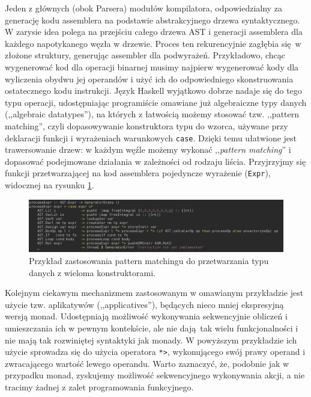 Jeden z głównych (obok Parsera) modułów kompilatora, odpowiedzialny za generację kodu assemblera na podstawie abstrakcyjnego drzewa syntaktycznego. W zarysie idea polega na przejściu całego drzewa AST i generacji assemblera dla każdego napotykanego węzła w drzewie. Proces ten rekurencyjnie zagłębia się w złożone struktury, generując assembler dla podwyrażeń. Przykładowo, chcąc wygenerować kod dla operacji binarnej musimy najpierw wygenerować kody dla wyliczenia obydwu jej operandów i użyć ich do odpowiedniego skonstruowania ostatecznego kodu instrukcji. Język Haskell wyjątkowo dobrze nadaje się do tego typu operacji, udostępniając programiście omawiane już algebraiczne typy danych (,,algebraic datatypes''), na których z łatwością możemy stosować tzw. ,,pattern matching'', czyli dopasowywanie konstruktora typu do wzorca, używane przy deklaracji funkcji i wyrażeniach warunkowych \texttt{case}. Dzięki temu ułatwione jest trawersowanie drzew: w każdym węźle możemy wykonać ,,\textit{pattern matching}'' i dopasować podejmowane działania w zależności od rodzaju liścia. Przyjrzyjmy się funkcji przetwarzającej na kod assemblera pojedyncze wyrażenie (\texttt{Expr}), widocznej na rysunku \ref{fig:processExpr}.

\begin{figure}
  \begin{center}
    \includegraphics[scale=0.5]{images/processExpr.png}
    \caption{Przykład zastosowania pattern matchingu do przetwarzania typu danych z wieloma konstruktorami.}
    \label{fig:processExpr}
  \end{center}
\end{figure}

Kolejnym ciekawym mechanizmem zastosowanym w omawianym przykładzie jest użycie tzw. aplikatywów (,,applicatives''), będących nieco mniej ekspresyjną wersją monad. Udostępniają możliwość wykonywania sekwencyjnie obliczeń i umieszczania ich w pewnym kontekście, ale nie dają tak wielu funkcjonalności i nie mają tak rozwiniętej syntaktyki jak monady. W powyższym przykładzie ich użycie sprowadza się do użycia operatora \texttt{*>}, wykonującego swój prawy operand i zwracającego wartość lewego operandu. Warto zaznaczyć, że, podobnie jak w przypadku monad, zyskujemy możliwość sekwencyjnego wykonywania akcji, a nie tracimy żadnej z zalet programowania funkcyjnego.

